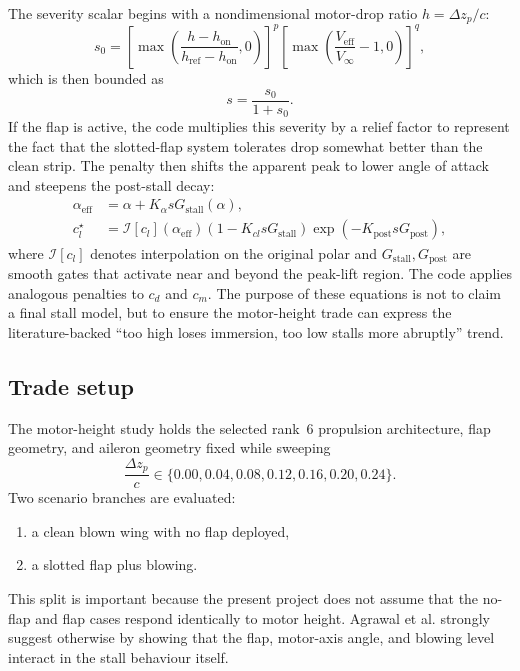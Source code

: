 \documentclass[conf]{new-aiaa}
\begin{document}
The severity scalar begins with a nondimensional motor-drop ratio \(h=\Delta z_p/c\):
\begin{equation}
s_0 =
\left[
\max\!\left(
\frac{h-h_{\mathrm{on}}}{h_{\mathrm{ref}}-h_{\mathrm{on}}},
0\right)
\right]^{p}
\left[\max\!\left(\frac{V_{\mathrm{eff}}}{V_\infty}-1,0\right)\right]^{q},
\end{equation}
which is then bounded as
\begin{equation}
s = \frac{s_0}{1+s_0}.
\end{equation}
If the flap is active, the code multiplies this severity by a relief factor to represent the fact that the slotted-flap system tolerates drop somewhat better than the clean strip. The penalty then shifts the apparent peak to lower angle of attack and steepens the post-stall decay:
\begin{align}
\alpha_{\mathrm{eff}} &= \alpha + K_\alpha s G_{\mathrm{stall}}(\alpha), \\
c_l^\star &=
\mathcal{I}[c_l](\alpha_{\mathrm{eff}})
\left(1-K_{cl}sG_{\mathrm{stall}}\right)
\exp\!\left(-K_{\mathrm{post}} s G_{\mathrm{post}}\right),
\end{align}
where \(\mathcal{I}[c_l]\) denotes interpolation on the original polar and \(G_{\mathrm{stall}}, G_{\mathrm{post}}\) are smooth gates that activate near and beyond the peak-lift region. The code applies analogous penalties to \(c_d\) and \(c_m\). The purpose of these equations is not to claim a final stall model, but to ensure the motor-height trade can express the literature-backed ``too high loses immersion, too low stalls more abruptly'' trend.

\subsection{Trade setup}

The motor-height study holds the selected rank~6 propulsion architecture, flap geometry, and aileron geometry fixed while sweeping
\begin{equation}
\frac{\Delta z_p}{c} \in \{0.00, 0.04, 0.08, 0.12, 0.16, 0.20, 0.24\}.
\end{equation}
Two scenario branches are evaluated:
\begin{enumerate}
\item a clean blown wing with no flap deployed,
\item a slotted flap plus blowing.
\end{enumerate}

This split is important because the present project does not assume that the no-flap and flap cases respond identically to motor height. Agrawal et al. strongly suggest otherwise by showing that the flap, motor-axis angle, and blowing level interact in the stall behaviour itself.\cite{Agrawal2019}
\end{document}
